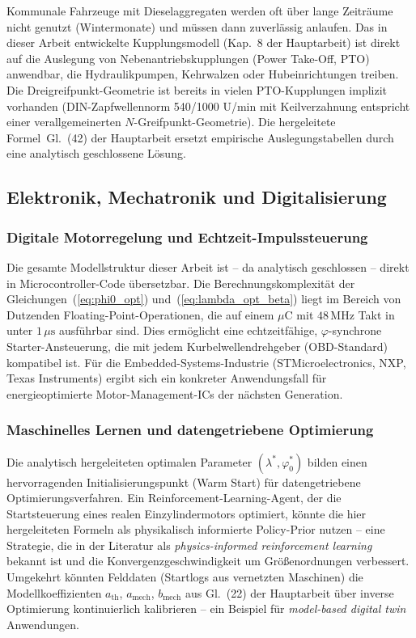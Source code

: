 ﻿\documentclass[a4paper,12pt]{article}
\begin{document}
Kommunale Fahrzeuge mit Dieselaggregaten werden oft über lange
Zeiträume nicht genutzt (Wintermonate) und müssen dann zuverlässig
anlaufen. Das in dieser Arbeit entwickelte Kupplungsmodell
(Kap.~8 der Hauptarbeit) ist direkt auf die Auslegung
von Nebenantriebskupplungen (Power Take-Off, PTO) anwendbar,
die Hydraulikpumpen, Kehrwalzen oder Hubeinrichtungen treiben.
Die Dreigreifpunkt-Geometrie ist bereits in vielen PTO-Kupplungen
implizit vorhanden (DIN-Zapfwellennorm 540/1000 U/min mit
Keilverzahnung entspricht einer verallgemeinerten $N$-Greifpunkt-Geometrie).
Die hergeleitete Formel~Gl.~(42) der Hauptarbeit ersetzt
empirische Auslegungstabellen durch eine analytisch geschlossene Lösung.

\subsection{Elektronik, Mechatronik und Digitalisierung}

\subsubsection{Digitale Motorregelung und Echtzeit-Impulssteuerung}

Die gesamte Modellstruktur dieser Arbeit ist -- da analytisch geschlossen --
direkt in Microcontroller-Code übersetzbar. Die Berechnungskomplexität
der Gleichungen~(\ref{eq:phi0_opt}) und~(\ref{eq:lambda_opt_beta})
liegt im Bereich von Dutzenden Floating-Point-Operationen, die auf einem
$\mu$C mit $48\,\text{MHz}$ Takt in unter $1\,\mu\text{s}$ ausführbar
sind. Dies ermöglicht eine echtzeitfähige, $\varphi$-synchrone
Starter-Ansteuerung, die mit jedem Kurbelwellendrehgeber (OBD-Standard)
kompatibel ist. Für die Embedded-Systems-Industrie
(STMicroelectronics, NXP, Texas Instruments) ergibt sich
ein konkreter Anwendungsfall für energieoptimierte
Motor-Management-ICs der nächsten Generation.

\subsubsection{Maschinelles Lernen und datengetriebene Optimierung}

Die analytisch hergeleiteten optimalen Parameter $(\lambda^*, \varphi_0^*)$
bilden einen hervorragenden Initialisierungspunkt (Warm Start)
für datengetriebene Optimierungsverfahren. Ein Reinforcement-Learning-Agent,
der die Startsteuerung eines realen Einzylindermotors optimiert,
könnte die hier hergeleiteten Formeln als physikalisch informierte
Policy-Prior nutzen -- eine Strategie, die in der Literatur als
\textit{physics-informed reinforcement learning} bekannt ist und die
Konvergenzgeschwindigkeit um Größenordnungen verbessert.
Umgekehrt könnten Felddaten (Startlogs aus vernetzten Maschinen)
die Modellkoeffizienten $a_\text{th}$, $a_\text{mech}$, $b_\text{mech}$
aus Gl.~(22) der Hauptarbeit über inverse Optimierung
kontinuierlich kalibrieren -- ein Beispiel für
\textit{model-based digital twin} Anwendungen.
\end{document}
